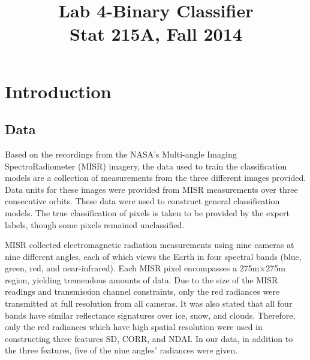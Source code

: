 \documentclass{article}\usepackage[]{graphicx}\usepackage[]{color}
\begin{document}
\title{Lab 4-Binary Classifier\\
Stat 215A, Fall 2014}


\maketitle
\section{Introduction}
\subsection{Data} Based on the recordings from the NASA's Multi-angle Imaging SpectroRadiometer (MISR) imagery, the data used to train the classification models are a collection of measurements from the three different images provided. Data units for these images were provided from MISR measurements over three consecutive orbits. These data were used to construct general classification models. The true classification of pixels is taken to be provided by the expert labels, though some pixels remained unclassified.

MISR collected electromagnetic radiation measurements using nine cameras at nine different angles, each of which views the Earth in four spectral bands (blue, green, red, and near-infrared).  Each MISR pixel encompasses a 275m$\times$275m region, yielding tremendous amounts of data. Due to the size of the MISR readings and transmission channel constraints, only the red radiances were transmitted at full resolution from all cameras. It was also stated that all four bands have similar reflectance signatures over ice, snow, and clouds. Therefore, only the red radiances which have high spatial resolution were used in constructing three features SD, CORR, and NDAI.  In our data, in addition to the three features, five of the nine angles' radiances were given.
\end{document}
